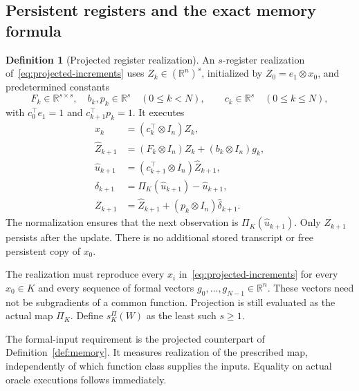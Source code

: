 \documentclass[11pt]{article}
\numberwithin{equation}{section}
\theoremstyle{definition}
\newtheorem{definition}[theorem]{Definition}
\newcommand{\R}{\mathbb R}
\begin{document}
\subsection{Persistent registers and the exact memory formula}
\begin{definition}[Projected register realization]\label{def:projected-memory}
An $s$-register realization of~\eqref{eq:projected-increments} uses $Z_k\in(\R^n)^s$, initialized by $Z_0=e_1\otimes x_0$, and predetermined constants
\[
 F_k\in\R^{s\times s},\quad b_k,p_k\in\R^s\quad(0\le k<N),
 \qquad c_k\in\R^s\quad(0\le k\le N),
\]
with $c_0^\top e_1=1$ and $c_{k+1}^\top p_k=1$. It executes
\begin{align}
 x_k&=(c_k^\top\otimes I_n)Z_k,\nonumber\\
 \widehat Z_{k+1}&=(F_k\otimes I_n)Z_k+(b_k\otimes I_n)g_k,\nonumber\\
 \widehat u_{k+1}&=(c_{k+1}^\top\otimes I_n)\widehat Z_{k+1},\label{eq:projected-state}\\
 \widehat\delta_{k+1}&=\Pi_K(\widehat u_{k+1})-\widehat u_{k+1},\nonumber\\
 Z_{k+1}&=\widehat Z_{k+1}+(p_k\otimes I_n)\widehat\delta_{k+1}.\nonumber
\end{align}
The normalization ensures that the next observation is $\Pi_K(\widehat u_{k+1})$. Only $Z_{k+1}$ persists after the update. There is no additional stored transcript or free persistent copy of $x_0$.

The realization must reproduce every $x_i$ in~\eqref{eq:projected-increments} for every $x_0\in K$ and every sequence of formal vectors $g_0,\ldots,g_{N-1}\in\R^n$. These vectors need not be subgradients of a common function. Projection is still evaluated as the actual map $\Pi_K$. Define $s_K^\Pi(W)$ as the least such $s\ge1$.
\end{definition}

The formal-input requirement is the projected counterpart of Definition~\ref{def:memory}. It measures realization of the prescribed map, independently of which function class supplies the inputs. Equality on actual oracle executions follows immediately.
\end{document}
